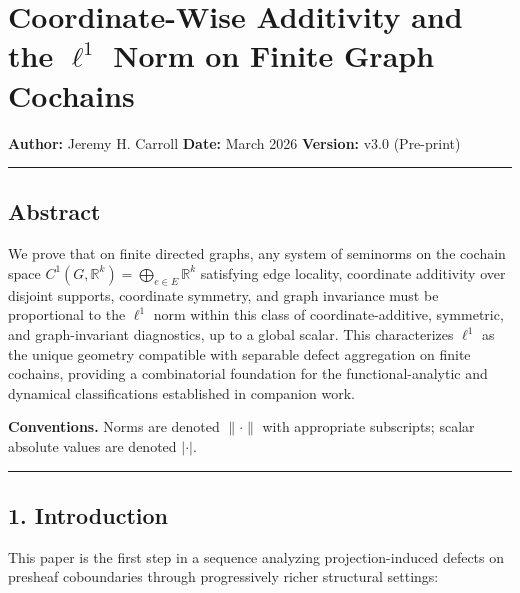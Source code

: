 \documentclass[
]{article}
\author{}
\date{}
\begin{document}
\section{\texorpdfstring{Coordinate-Wise Additivity and the \(\ell^1\)
Norm on Finite Graph
Cochains}{Coordinate-Wise Additivity and the \textbackslash ell\^{}1 Norm on Finite Graph Cochains}}\label{coordinate-wise-additivity-and-the-ell1-norm-on-finite-graph-cochains}

\textbf{Author:} Jeremy H. Carroll \textbf{Date:} March 2026
\textbf{Version:} v3.0 (Pre-print)

\begin{center}\rule{0.5\linewidth}{0.5pt}\end{center}

\subsection{Abstract}\label{abstract}

We prove that on finite directed graphs, any system of seminorms on the
cochain space
\(C^1(G, \mathbb{R}^k) = \bigoplus_{e \in E} \mathbb{R}^k\) satisfying
edge locality, coordinate additivity over disjoint supports, coordinate
symmetry, and graph invariance must be proportional to the \(\ell^1\)
norm within this class of coordinate-additive, symmetric, and
graph-invariant diagnostics, up to a global scalar. This characterizes
\(\ell^1\) as the unique geometry compatible with separable defect
aggregation on finite cochains, providing a combinatorial foundation for
the functional-analytic and dynamical classifications established in
companion work.

\textbf{Conventions.} Norms are denoted \(\lVert \cdot \rVert\) with
appropriate subscripts; scalar absolute values are denoted \(|\cdot|\).

\begin{center}\rule{0.5\linewidth}{0.5pt}\end{center}

\subsection{1. Introduction}\label{introduction}

This paper is the first step in a sequence analyzing projection-induced
defects on presheaf coboundaries through progressively richer structural
settings:
\end{document}
